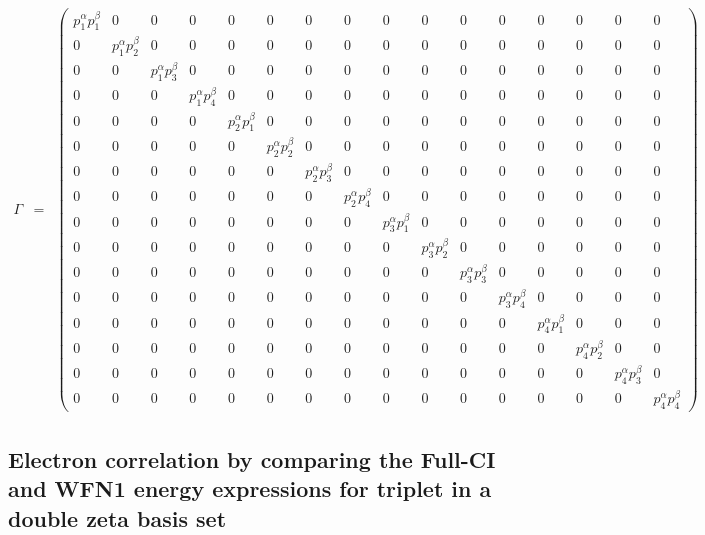 \documentclass[pra,nofootinbib]{revtex4-1}
\begin{document}
\begin{eqnarray}
  \Gamma &=&
  \begin{pmatrix}
  p_{1}^\alpha p_{1}^\beta & 0 & 0 & 0 & 0 & 0 & 0 & 0 & 0 & 0 & 0 & 0 & 0 & 0 & 0 & 0 \\
  0 & p_{1}^\alpha p_{2}^\beta & 0 & 0 & 0 & 0 & 0 & 0 & 0 & 0 & 0 & 0 & 0 & 0 & 0 & 0 \\
  0 & 0 & p_{1}^\alpha p_{3}^\beta & 0 & 0 & 0 & 0 & 0 & 0 & 0 & 0 & 0 & 0 & 0 & 0 & 0 \\
  0 & 0 & 0 & p_{1}^\alpha p_{4}^\beta & 0 & 0 & 0 & 0 & 0 & 0 & 0 & 0 & 0 & 0 & 0 & 0 \\
  0 & 0 & 0 & 0 & p_{2}^\alpha p_{1}^\beta & 0 & 0 & 0 & 0 & 0 & 0 & 0 & 0 & 0 & 0 & 0 \\
  0 & 0 & 0 & 0 & 0 & p_{2}^\alpha p_{2}^\beta & 0 & 0 & 0 & 0 & 0 & 0 & 0 & 0 & 0 & 0 \\
  0 & 0 & 0 & 0 & 0 & 0 & p_{2}^\alpha p_{3}^\beta & 0 & 0 & 0 & 0 & 0 & 0 & 0 & 0 & 0 \\
  0 & 0 & 0 & 0 & 0 & 0 & 0 & p_{2}^\alpha p_{4}^\beta & 0 & 0 & 0 & 0 & 0 & 0 & 0 & 0 \\
  0 & 0 & 0 & 0 & 0 & 0 & 0 & 0 & p_{3}^\alpha p_{1}^\beta & 0 & 0 & 0 & 0 & 0 & 0 & 0 \\
  0 & 0 & 0 & 0 & 0 & 0 & 0 & 0 & 0 & p_{3}^\alpha p_{2}^\beta & 0 & 0 & 0 & 0 & 0 & 0 \\
  0 & 0 & 0 & 0 & 0 & 0 & 0 & 0 & 0 & 0 & p_{3}^\alpha p_{3}^\beta & 0 & 0 & 0 & 0 & 0 \\
  0 & 0 & 0 & 0 & 0 & 0 & 0 & 0 & 0 & 0 & 0 & p_{3}^\alpha p_{4}^\beta & 0 & 0 & 0 & 0 \\
  0 & 0 & 0 & 0 & 0 & 0 & 0 & 0 & 0 & 0 & 0 & 0 & p_{4}^\alpha p_{1}^\beta & 0 & 0 & 0 \\
  0 & 0 & 0 & 0 & 0 & 0 & 0 & 0 & 0 & 0 & 0 & 0 & 0 & p_{4}^\alpha p_{2}^\beta & 0 & 0 \\
  0 & 0 & 0 & 0 & 0 & 0 & 0 & 0 & 0 & 0 & 0 & 0 & 0 & 0 & p_{4}^\alpha p_{3}^\beta & 0 \\
  0 & 0 & 0 & 0 & 0 & 0 & 0 & 0 & 0 & 0 & 0 & 0 & 0 & 0 & 0 & p_{4}^\alpha p_{4}^\beta
  \end{pmatrix}
\end{eqnarray}

\subsection{Electron correlation by comparing the Full-CI and WFN1 energy expressions for triplet 
            in a double zeta basis set}
\end{document}
